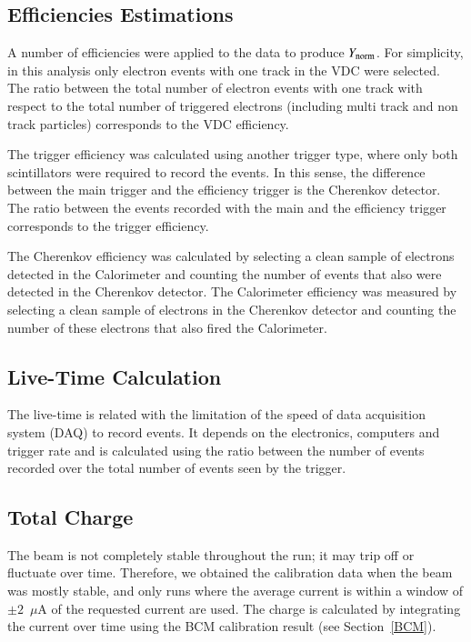 \documentclass[final,5p,times,twocolumn]{elsarticle}
\begin{document}
\subsection{Efficiencies Estimations } 
 
A number of efficiencies were applied to the data to produce $Y_{\rm{norm}}$.  For simplicity, in this analysis 
only electron events with one track in the VDC were selected.  
The ratio between the total number of electron events with one track with respect to the total number of triggered 
electrons (including multi track and non track particles) corresponds to the VDC efficiency. 

The trigger efficiency 
was calculated using another trigger type, where only both scintillators were required to record the events. 
In this sense, the difference between the main trigger and the efficiency trigger is the Cherenkov detector.  
The ratio between the events recorded with the main and the efficiency trigger corresponds to the trigger efficiency. 

The Cherenkov efficiency was calculated by selecting a clean sample of electrons detected in the Calorimeter 
and counting the number of events that also were detected in the Cherenkov detector. The Calorimeter efficiency 
was measured by selecting a clean sample of electrons in the Cherenkov detector and counting the number of 
these electrons that also fired the Calorimeter.

\subsection{Live-Time Calculation } 

The live-time is related with the limitation of the speed of data acquisition system (DAQ) to record events. It depends on the electronics, computers and trigger rate and is calculated using the ratio between the number of events recorded over the total number of events seen by the trigger. 

\subsection{ Total Charge}

The beam is not completely stable throughout the run; it may trip off or fluctuate over time.
Therefore, we obtained the calibration data when the beam was mostly stable, and only runs
where the average current is within a window of $\pm 2$~$\mu$A of the requested current are used. 
The charge is calculated by integrating the current over time using the BCM calibration result (see Section~\ref{BCM}).
\end{document}

